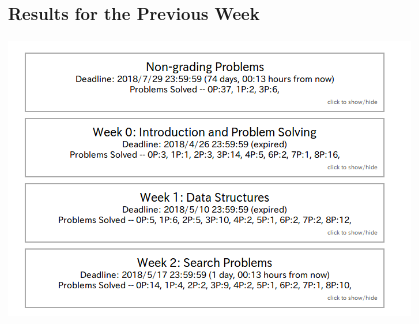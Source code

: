 \begin{frame}
  \frametitle{Results for the Previous Week}

  \begin{center}
    \includegraphics[width=0.8\textwidth]{img/resultsW3_2018}

  \end{center}
\end{frame}


